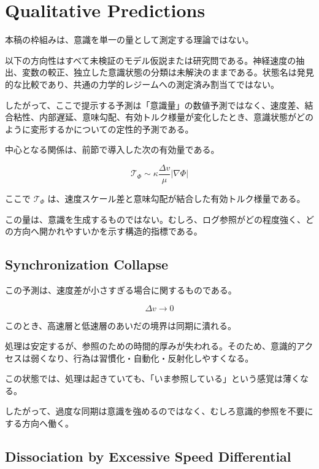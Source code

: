 \section{Qualitative Predictions}


本稿の枠組みは、意識を単一の量として測定する理論ではない。

以下の方向性はすべて未検証のモデル仮説または研究問である。神経速度の抽出、変数の較正、独立した意識状態の分類は未解決のままである。状態名は発見的な比較であり、共通の力学的レジームへの測定済み割当てではない。

したがって、ここで提示する予測は「意識量」の数値予測ではなく、速度差、結合粘性、内部遅延、意味勾配、有効トルク様量が変化したとき、意識状態がどのように変形するかについての定性的予測である。

中心となる関係は、前節で導入した次の有効量である。

\begin{equation}
\mathcal{T}_{\Phi}
\sim
\kappa
\frac{\Delta v}{\mu}
\left|\nabla \Phi\right|
\end{equation}

ここで $\mathcal{T}_{\Phi}$ は、速度スケール差と意味勾配が結合した有効トルク様量である。

この量は、意識を生成するものではない。むしろ、ログ参照がどの程度強く、どの方向へ開かれやすいかを示す構造的指標である。

\subsection{Synchronization Collapse}

この予測は、速度差が小さすぎる場合に関するものである。

\begin{equation}
\Delta v \rightarrow 0
\end{equation}

このとき、高速層と低速層のあいだの境界は同期に潰れる。

処理は安定するが、参照のための時間的厚みが失われる。そのため、意識的アクセスは弱くなり、行為は習慣化・自動化・反射化しやすくなる。

この状態では、処理は起きていても、「いま参照している」という感覚は薄くなる。

したがって、過度な同期は意識を強めるのではなく、むしろ意識的参照を不要にする方向へ働く。

\subsection{Dissociation by Excessive Speed Differential}

